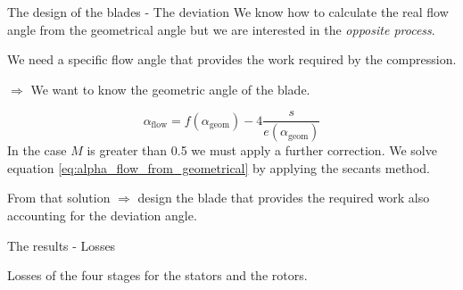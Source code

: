 \documentclass{beamer}
\newcommand{\highlightgreenC}[1]{\textcolor{chameleongreen3}{#1}}%
\begin{document}
\begin{frame}[t]{The design of the blades - The deviation}
We know how to calculate the real flow angle from the geometrical angle but we are interested in the \emph{opposite process}.

We need a specific flow angle that provides the work required by the compression.
\begin{center}
$\Rightarrow$ We want to know the \highlightgreenC{geometric angle} of the blade.
\end{center}
\begin{equation}
\label{eq:alpha_flow_from_geometrical}
\alpha_\text{flow} = f(\alpha_\text{geom}) - 4 \frac{s}{e(\alpha_\text{geom})}
\end{equation}
In the case $M$ is greater than 0.5 we must apply a further correction.
We solve equation \ref{eq:alpha_flow_from_geometrical} by applying the secants method.

\begin{center}
From that solution $\Rightarrow$ design the blade that provides the required work also accounting for the deviation angle.
\end{center}
\end{frame}


\begin{frame}[t]{The results - Losses}
\begin{center}
Losses of the four stages for the stators and the rotors.
\end{center}
\vspace{-0.0cm}
\begin{figure}%
    \centering
\end{figure}
\end{frame}
\end{document}
